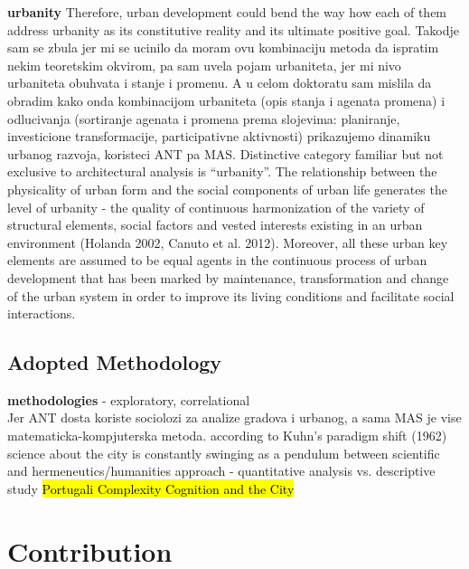 \documentclass[11pt]{report}
\begin{document}
\textbf{urbanity}
Therefore, urban development could bend the way how each of them address urbanity as its constitutive reality and its ultimate positive goal.
Takodje sam se zbula jer mi se ucinilo da moram ovu kombinaciju metoda da ispratim nekim teoretskim okvirom, pa sam uvela pojam urbaniteta, jer mi nivo urbaniteta obuhvata i stanje i promenu. A u celom doktoratu sam mislila da obradim kako onda kombinacijom urbaniteta (opis stanja i agenata promena) i odlucivanja (sortiranje agenata i promena prema slojevima: planiranje, investicione transformacije, participativne aktivnosti) prikazujemo dinamiku urbanog razvoja, koristeci  ANT pa MAS. 
Distinctive category familiar but not exclusive to architectural analysis is “urbanity”. The relationship between the physicality of urban form and the social components of urban life generates the level of urbanity - the quality of continuous harmonization of the variety of structural elements, social factors and vested interests existing in an urban environment (Holanda 2002, Canuto et al. 2012). Moreover, all these urban key elements are assumed to be equal agents in the continuous process of urban development that has been marked by maintenance, transformation and change of the urban system in order to improve its living conditions and facilitate social interactions.

\subsection{Adopted Methodology}

\textbf{methodologies} - exploratory, correlational
\\
Jer ANT dosta koriste sociolozi za analize gradova i urbanog, a sama MAS je vise matematicka-kompjuterska metoda. 
according to Kuhn's paradigm shift (1962) science about the city is constantly swinging as a pendulum between scientific and hermeneutics/humanities approach - quantitative analysis vs. descriptive study \hl{Portugali Complexity Cognition and the City}

\section{Contribution}
\end{document}
